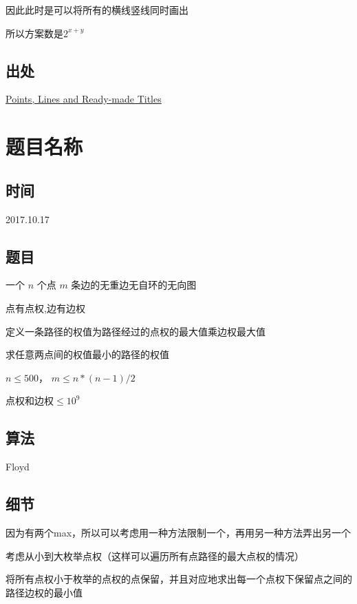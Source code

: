 \documentclass[a4paper]{article}
\begin{document}
		因此此时是可以将所有的横线竖线同时画出
		
		所以方案数是$2^{x+y}$
		
	\subsection{出处}
		
		\href {http://codeforces.com/problemset/problem/870/E}{Points, Lines and Ready-made Titles}
	
	\newpage
	
	\section{题目名称}
		
	\subsection{时间}
		
		2017.10.17
		
	\subsection{题目}
		
		一个 $n$ 个点 $m$ 条边的无重边无自环的无向图
		
		点有点权,边有边权
		
		定义一条路径的权值为路径经过的点权的最大值乘边权最大值
		
		求任意两点间的权值最小的路径的权值
		
		$n \leq 500$，		
		$m \leq n * (n - 1) / 2$
		
		点权和边权$\leq 10^9$
		
	\subsection{算法}
		
		Floyd
		
	\subsection{细节}
		
		因为有两个max，所以可以考虑用一种方法限制一个，再用另一种方法弄出另一个
		
		考虑从小到大枚举点权（这样可以遍历所有点路径的最大点权的情况）
		
		将所有点权小于枚举的点权的点保留，并且对应地求出每一个点权下保留点之间的路径边权的最小值
		
\end{document}
